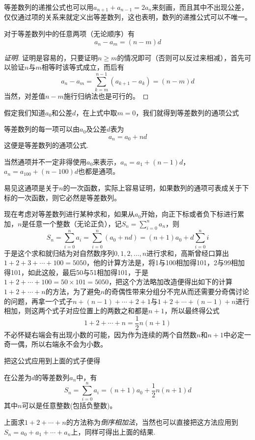 等差数列的递推公式也可以用$a_{n+1}+a_{n-1}=2a_n$来刻画，而且其中不出现公差，仅仅通过项的关系来就定义出等差数列，这也表明，数列的递推公式可以不唯一。

\begin{theorem}
对于等差数列中的任意两项（无论顺序）有
\[ a_n-a_m=(n-m)d \]
\end{theorem}

\begin{proof}[证明]
证明是容易的，只要证明$n\geqslant m$的情况即可（否则可以反过来相减），首先可以验证$n$与$m$相等时该等式成立，而后有
\[ a_n-a_m=\sum_{k=m}^{n-1}(a_{k+1}-a_k)=(n-m)d \]
当然，对差值$n-m$施行归纳法也是可行的。
\end{proof}

假定我们知道$a_0$和公差$d$，在上式中取$m=0$，我们就得到等差数列的通项公式
\begin{theorem}
  等差数列的每一项可以由$a_0$及公差$d$表为
\[ a_n=a_0+nd \]
这便是等差数列的通项公式.
\end{theorem}

当然通项并不一定非得使用$a_0$来表示，$a_n=a_1+(n-1)d$，$a_n=a_{100}+(n-100)d$也都是通项。

易见这通项是关于$n$的一次函数，实际上容易证明，如果数列的通项可表成关于下标的一次函数，则它必然是等差数列。

现在考虑对等差数列进行某种求和，如果从$a_0$开始，向正下标或者负下标进行累加，$n$是任意一个整数（无论正负），记$S_n=\sum_{i=0}^{n}a_n$，则
\[ S_n=\sum_{i=0}^na_i=\sum_{i=0}^n(a_0+nd)=(n+1)a_0+d\sum_{i=0}^ni\]
于是这个求和就归结为对自然数序列$0,1,2,\ldots,n$进行求和，高斯曾经口算出$1+2+3+\cdots+100=5050$，他的计算方法是，将1与100相加得101，2与99相加得101，如此这般，最后50与51相加得101，于是$1+2+\cdots+100=50 \times 101=5050$，把这个方法略加改造便得出如下的计算$1+2+\cdots+n$的方法，为了避免$n$的奇偶性带来分组分不完从而还需要分奇偶讨论的问题，再拿一个式子$n+(n-1)+\cdots+2+1$与$1+2+\cdots+(n-1)+n$进行相加，则这两个式子对应位置上的两数之和都是$n+1$，所以最终得公式
\[ 1+2+\cdots+n = \frac{1}{2}n(n+1) \]
不必怀疑右端会有出现小数的可能，因为作为连续的两个自然数$n$和$n+1$中必定一奇一偶，所以右端永不会为小数。

把这公式应用到上面的式子便得
\begin{theorem}
  在公差为$d$的等差数列$a_n$中，有
  \[ S_n=\sum_{i=0}^na_i=(n+1)a_0+\frac{1}{2}n(n+1)d \]
  其中$n$可以是任意整数(包括负整数)。
\end{theorem}

上面求$1+2+\cdots+n$的方法称为\emph{倒序相加法}，当然也可以直接把这方法应用到$S_n=a_0+a_1+\cdots+a_n$上，同样可得出上面的结果.

